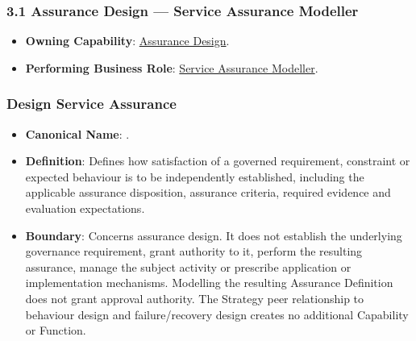 \label{rad:assurance:64}
\subsubsection*{3.1 Assurance Design — Service Assurance Modeller}
\label{rad:assurance:66}

\begin{itemize}

\item 
\textbf{Owning Capability}: \hyperref[rad:enabling:680]{Assurance Design}.



\item 
\textbf{Performing Business Role}: \href{https://github.com/fhirfactory/harmonia/blob/98410db60155198a75f74c79d98060070209faa1/docs/markdown/03-business-architecture/actors-roles/roles.md\#service-assurance-modeller}{Service Assurance Modeller}.



\end{itemize}
\label{rad:assurance:69}



\label{rad:assurance:71}
\subsubsection*{Design Service Assurance}
\label{rad:assurance:73}

\begin{itemize}

\item 
\textbf{Canonical Name}: \texttt{}.



\item 
\textbf{Definition}: Defines how satisfaction of a governed requirement, constraint or expected behaviour is to be independently established, including the applicable assurance disposition, assurance criteria, required evidence and evaluation expectations.



\item 
\textbf{Boundary}: Concerns assurance design. It does not establish the underlying governance requirement, grant authority to it, perform the resulting assurance, manage the subject activity or prescribe application or implementation mechanisms. Modelling the resulting Assurance Definition does not grant approval authority. The Strategy peer relationship to behaviour design and failure/\allowbreak{}recovery design creates no additional Capability or Function.



\end{itemize}
\label{rad:assurance:77}
